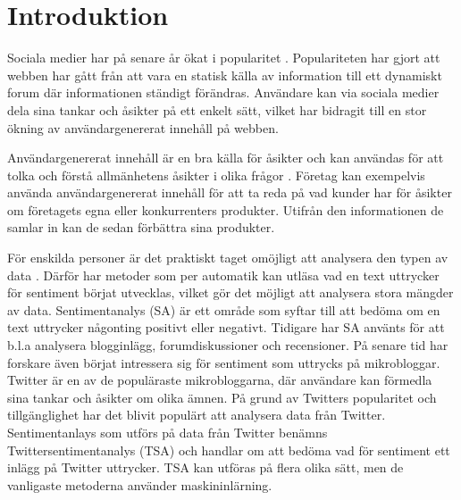 \documentclass{kaumasters} %
\begin{document}
\tableofcontents{}
\listoffigures
\listoftables
\lstlistoflistings

\mainmatter
\pagestyle{fancy}
\fancyhead[LE,RO]{\thepage}
\fancyhead[RE,LO]{\rightmark}
\fancyfoot{}
\chapter{Introduktion}
Sociala medier har på senare år ökat i popularitet \cite{TSAsurvey}. Populariteten har gjort att webben har gått från att vara en statisk källa av information till ett dynamiskt forum där informationen ständigt förändras. Användare kan via sociala medier dela sina tankar och åsikter på ett enkelt sätt, vilket har bidragit till en stor ökning av användargenererat innehåll på webben. 

Användargenererat innehåll är en bra källa för åsikter och kan användas för att tolka och förstå allmänhetens åsikter i olika frågor \cite{TSAsurvey}. Företag kan exempelvis använda användargenererat innehåll för att ta reda på vad kunder har för åsikter om företagets egna eller konkurrenters produkter. Utifrån den informationen de samlar in kan de sedan förbättra sina produkter.

För enskilda personer är det praktiskt taget omöjligt att analysera den typen av data \cite{TSAsurvey}. Därför har metoder som per automatik kan utläsa vad en text uttrycker för sentiment börjat utvecklas, vilket gör det möjligt att analysera stora mängder av data. Sentimentanalys (SA) är ett område som syftar till att bedöma om en text uttrycker någonting positivt eller negativt. Tidigare har SA använts för att b.l.a analysera blogginlägg, forumdiskussioner och recensioner. På senare tid har forskare även börjat intressera sig för sentiment som uttrycks på mikrobloggar. Twitter är en av de populäraste mikrobloggarna, där användare kan förmedla sina tankar och åsikter om olika ämnen. På grund av Twitters popularitet och tillgänglighet har det blivit populärt att analysera data från Twitter. Sentimentanlays som utförs på data från Twitter benämns Twittersentimentanalys (TSA) och handlar om att bedöma vad för sentiment ett inlägg på Twitter uttrycker.  TSA kan utföras på flera olika sätt, men de vanligaste metoderna använder maskininlärning.
\end{document}

